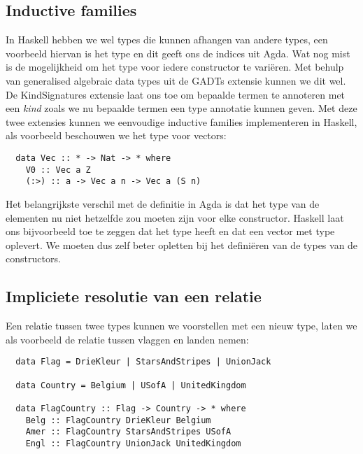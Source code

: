\subsection{Inductive families}

In Haskell hebben we wel types die kunnen afhangen van andere types, een
voorbeeld hiervan is het  type en dit geeft ons de indices uit
Agda. Wat nog mist is de mogelijkheid om het type voor iedere constructor te
variëren. Met behulp van generalised algebraic data types uit de GADTs extensie
kunnen we dit wel. De KindSignatures extensie laat ons toe om bepaalde termen
te annoteren met een \emph{kind} zoals we nu bepaalde termen een type annotatie
kunnen geven. Met deze twee extensies kunnen we eenvoudige inductive families
implementeren in Haskell, als voorbeeld beschouwen we het type voor vectors:

\begin{verbatim}
  data Vec :: * -> Nat -> * where
    V0 :: Vec a Z
    (:>) :: a -> Vec a n -> Vec a (S n)
\end{verbatim}

Het belangrijkste verschil met de definitie in Agda is dat het type van de
elementen nu niet hetzelfde zou moeten zijn voor elke constructor. Haskell laat
ons bijvoorbeeld toe te zeggen dat  het type  heeft
en dat \ihask{(:>)} een vector met type  oplevert. We
moeten dus zelf beter opletten bij het definiëren van de types van de
constructors.

\subsection{Impliciete resolutie van een relatie}

Een relatie tussen twee types kunnen we voorstellen met een nieuw type, laten
we als voorbeeld de relatie tussen vlaggen en landen nemen:

\begin{verbatim}
  data Flag = DrieKleur | StarsAndStripes | UnionJack

  data Country = Belgium | USofA | UnitedKingdom

  data FlagCountry :: Flag -> Country -> * where
    Belg :: FlagCountry DrieKleur Belgium
    Amer :: FlagCountry StarsAndStripes USofA
    Engl :: FlagCountry UnionJack UnitedKingdom
\end{verbatim}

